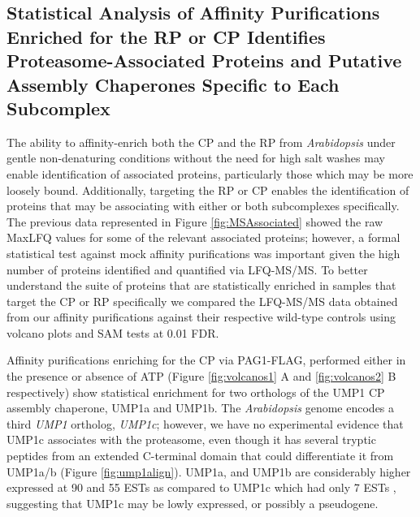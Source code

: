 \subsection{Statistical Analysis of Affinity Purifications Enriched for the RP or CP Identifies Proteasome-Associated Proteins and Putative Assembly Chaperones Specific to Each Subcomplex}
	The ability to affinity-enrich both the CP and the RP from \textit{Arabidopsis} under gentle non-denaturing conditions without the need for high salt washes may enable identification of associated proteins, particularly those which may be more loosely bound. Additionally, targeting the RP or CP enables the identification of proteins that may be associating with either or both subcomplexes specifically. The previous data represented in Figure \ref{fig:MSAssociated} showed the raw MaxLFQ values for some of the relevant associated proteins; however, a formal statistical test against mock affinity purifications was important given the high number of proteins identified and quantified via LFQ-MS/MS. To better understand the suite of proteins that are statistically enriched in samples that target the CP or RP specifically we compared the LFQ-MS/MS data obtained from our affinity purifications against their respective wild-type controls using volcano plots and SAM tests at 0.01 FDR.
	
Affinity purifications enriching for the CP via PAG1-FLAG, performed either in the presence or absence of ATP (Figure \ref{fig:volcanos1} A and  \ref{fig:volcanos2} B respectively) show statistical enrichment for two orthologs of the UMP1 CP assembly chaperone, UMP1a and UMP1b. The \textit{Arabidopsis} genome encodes a third \textit{UMP1} ortholog, \textit{UMP1c}; however, we have no experimental evidence that UMP1c associates with the proteasome, even though it has several tryptic peptides from an extended C-terminal domain that could differentiate it from UMP1a/b (Figure \ref{fig:ump1align}). UMP1a, and UMP1b are considerably higher expressed at 90 and 55 ESTs as compared to UMP1c which had only 7 ESTs \citep{berardini15}, suggesting that UMP1c may be lowly expressed, or possibly a pseudogene. 

